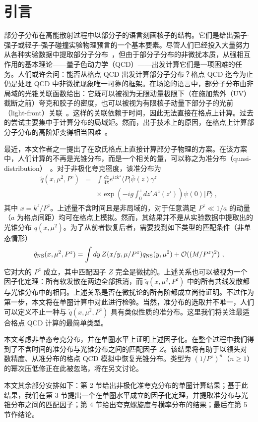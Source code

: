 \section{引言}
部分子分布在高能散射过程中以部分子的语言刻画核子的结构。它们是给出强子-强子或轻子-强子碰撞实验物理预言的一个基本要素。尽管人们已经投入大量努力从各种实验数据中提取部分子分布~\cite{Alekhin:2012ig,Gao:2013xoa,Radescu:2010zz,CooperSarkar:2011aa,Martin:2009iq,Ball:2012cx}，但由于部分子分布的非微扰本质，从强相互作用的基本理论——量子色动力学（QCD）——出发计算它们是一项困难的任务。人们或许会问：能否从格点 QCD 出发计算部分子分布？格点 QCD 迄今为止仍是处理 QCD 中非微扰现象唯一可靠的框架。在场论的语言中，部分子分布由非局域的光锥关联函数给出：它既可以被视为无限动量极限下（在施加紫外（UV）截断之前）夸克和胶子的密度，也可以被视为有限核子动量下部分子的光前（light-front）关联~\cite{Collins:2011zzd}。这样的关联依赖于时间，因此无法直接在格点上计算。过去的尝试主要集中于计算分布的局域矩。然而，出于技术上的原因，在格点上计算部分子分布的高阶矩变得相当困难~\cite{negele}。

最近，本文作者之一提出了在欧氏格点上直接计算部分子物理的方案。在该方案中，人们计算的不再是光锥分布，而是一个相关的量，可以称之为准分布（quasi-distribution）~\cite{footnote}。对于非极化夸克密度，该准分布为~\cite{Ji:2013dva}
\begin{eqnarray}\label{qUnpolDef}
   \tilde q(x,\mu^2, P^z) &=& \int \frac{dz}{4\pi} e^{izk^z}  \langle P|\overline{\psi}(z)
   \gamma^z \\
   && \times \exp\left(-ig\int^{z}_0 dz' A^z(z') \right)\psi(0) |P\rangle \ ,  \nonumber
\end{eqnarray}
其中 $x= k^z/P^z$。上述量不含时间且是非局域的，对于任意满足 $P^z\ll 1/a$ 的动量（$a$ 为格点间距）均可在格点上模拟。然而，其结果并不是从实验数据中提取出的光锥分布 $q(x, \mu^2)$。为了从前者恢复后者，需要找到如下类型的匹配条件（非单态情形）
\begin{equation}
   \tilde q_{\rm NS}(x, \mu^2, P^z) = \int dy\, Z(x/y, \mu/P^z) q_{\rm NS}(y, \mu^2) + {\cal O} ((M/P^z)^2) \ ,
\end{equation}
它对大的 $P^z$ 成立，其中匹配因子 $Z$ 完全是微扰的。上述关系也可以被视为一个因子化定理：所有软发散在两边全部抵消，而 $\tilde q(x, \mu^2, P^z)$ 中的所有共线发散都与光锥分布中的相同。上述关系是否在微扰论的所有阶都成立尚待证明。不过作为第一步，本文将在单圈计算中对此进行检验。当然，准分布的选取并不唯一，人们可以定义不止一种与 $\tilde q(x, \mu^2, P^z)$ 具有类似性质的准分布。这里我们将关注最适合格点 QCD 计算的最简单类型。

本文考虑非单态夸克分布，并在单圈水平上证明上述因子化。在整个过程中我们得到了不含时间的准分布与光锥分布之间的匹配因子 $Z$。该结果将有助于以领头对数精度、从准分布的格点 QCD 模拟中恢复光锥分布。类型为 $(1/P^z)^{n}$（$n\ge 1$）的幂次压低修正在此被忽略，将在另文讨论。

本文其余部分安排如下：第 2 节给出非极化准夸克分布的单圈计算结果；基于此结果，我们在第 3 节提出一个在单圈水平成立的因子化定理，并提取准分布与光锥分布之间的匹配因子；第 4 节给出夸克螺旋度与横率分布的结果；最后在第 5 节作结论。
